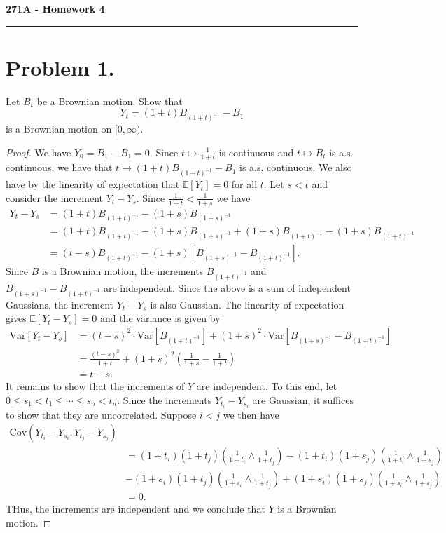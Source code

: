 \documentclass[11pt,letterpaper]{report}
\newcommand{\E}{\mathbb{E}}
\newcommand{\Var}{\text{Var}}
\newcommand{\Cov}{\text{Cov}}
\begin{document}
\begin{center}
{\bf \Large 271A - Homework 4}
\vspace{0.2cm}
\hrule
\end{center}

\section*{Problem 1. }
Let $B_t$ be a Brownian motion. Show that
\[
Y_t = (1+t)B_{(1+t)^{-1}}-B_1
\]
is a Brownian motion on $[0, \infty)$.
\begin{proof}
	We have $Y_0 = B_1 - B_1 = 0$. Since $t\mapsto \frac{1}{1+t}$ is continuous and $t\mapsto B_t$ is a.s. continuous, we have that $t\mapsto (1+t)B_{(1+t)^{-1}}-B_1$ is a.s. continuous. We also have by the linearity of expectation that $\E[Y_t] = 0$ for all $t$. Let $s<t$ and consider the increment $Y_t - Y_s$. Since $\frac{1}{1+t}<\frac{1}{1+s}$ we have
	\begin{align*}
		Y_t - Y_s &= (1+t)B_{(1+t)^{-1}} - (1+s)B_{(1+s)^{-1}}\\
		&=(1+t)B_{(1+t)^{-1}} - (1+s)B_{(1+s)^{-1}} + (1+s)B_{(1+t)^{-1}}-(1+s)B_{(1+t)^{-1}}\\
		&= (t-s)B_{(1+t)^{-1}} - (1+s)[B_{(1+s)^{-1}}-B_{(1+t)^{-1}}].
	\end{align*}
	Since $B$ is a Brownian motion, the increments $B_{(1+t)^{-1}}$ and $B_{(1+s)^{-1}}-B_{(1+t)^{-1}}$ are independent. Since the above is a sum of independent Gaussians, the increment $Y_t-Y_s$ is also Gaussian. The linearity of expectation gives $\E[Y_t-Y_s] = 0$ and the variance is given by
	\begin{align*}
		\Var[Y_t-Y_s] &= (t-s)^2\cdot \Var[B_{(1+t)^{-1}}] + (1+s)^2\cdot \Var[B_{(1+s)^{-1}}-B_{(1+t)^{-1}}]\\
		&= \frac{(t-s)^2}{1+t} + (1+s)^2\left(\frac{1}{1+s}-\frac{1}{1+t}\right)\\
		&= t-s.
	\end{align*}
	It remains to show that the increments of $Y$ are independent. To this end, let $0\leq s_1<t_1\leq \cdots \leq s_n<t_n$. Since the increments $Y_{t_i}-Y_{s_i}$ are Gaussian, it suffices to show that they are uncorrelated. Suppose $i<j$ we then have
	\begin{align*}
		\Cov(Y_{t_i}-Y_{s_i}, Y_{t_j}-Y_{s_j})&\\
		&= (1+t_i)(1+t_j)\left(\frac{1}{1+t_i}\land \frac{1}{1+t_j}\right) - (1+t_i)(1+s_j)\left(\frac{1}{1+t_i}\land \frac{1}{1+s_j}\right)\\
		&-(1+s_i)(1+t_j)\left(\frac{1}{1+s_i}\land \frac{1}{1+t_j}\right)+(1+s_i)(1+s_j)\left(\frac{1}{1+s_i}\land \frac{1}{1+s_j}\right)\\
		&= 0.
	\end{align*}
	THus, the increments are independent and we conclude that $Y$ is a Brownian motion.
\end{proof}
\end{document}
